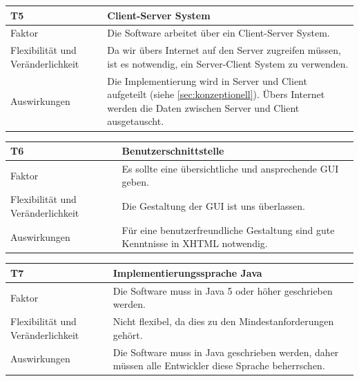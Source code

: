 \documentclass[fontsize=12pt,paper=a4,twoside]{scrartcl}
\begin{document}
\begin{table}[H]
\begin{tabular}{|p{3cm}|p{12cm}|}\hline
\textbf{T5} & \textbf{Client-Server System} \\ \hline \hline
Faktor & Die Software arbeitet über ein Client-Server System.\\ \hline
Flexibilität und Veränderlichkeit & Da wir übers Internet auf den Server zugreifen müssen, ist es notwendig, ein Server-Client System zu verwenden. \\ \hline
Auswirkungen & Die Implementierung wird in Server und Client aufgeteilt (siehe \ref{sec:konzeptionell}). Übers Internet werden die Daten zwischen Server und Client ausgetauscht.\\ \hline
\end{tabular}
\end{table}

\begin{table}[H]
\begin{tabular}{|p{3cm}|p{12cm}|}\hline
\textbf{T6} & \textbf{Benutzerschnittstelle} \\ \hline \hline
Faktor & Es sollte eine übersichtliche und ansprechende GUI geben.\\ \hline
Flexibilität und Veränderlichkeit & Die Gestaltung der GUI ist uns überlassen. \\ \hline
Auswirkungen & Für eine benutzerfreundliche Gestaltung sind gute Kenntnisse in XHTML notwendig.\\ \hline
\end{tabular}
\end{table}

\begin{table}[H]
\begin{tabular}{|p{3cm}|p{12cm}|}\hline
\textbf{T7} & \textbf{Implementierungssprache Java} \\ \hline \hline
Faktor & Die Software muss in Java 5 oder höher geschrieben werden.\\ \hline
Flexibilität und Veränderlichkeit & Nicht flexibel, da dies zu den Mindestanforderungen gehört.\\ \hline
Auswirkungen & Die Software muss in Java geschrieben werden, daher müssen alle Entwickler diese Sprache beherrschen. \\ \hline
\end{tabular}
\end{table}
\end{document}
